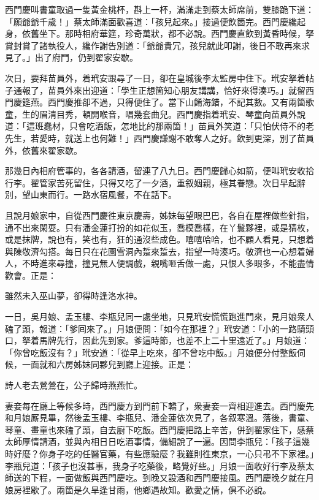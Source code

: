 西門慶叫書童取過一隻黃金桃杯，斟上一杯，滿滿走到蔡太師席前，雙膝跪下道：「願爺爺千歲！」蔡太師滿面歡喜道：「孩兒起來。」接過便飲箇完。西門慶纔起身，依舊坐下。那時相府華筵，珍奇萬狀，都不必說。西門慶直飲到黃昏時候，拏賞封賞了諸執役人，纔作謝告別道：「爺爺貴冗，孩兒就此叩謝，後日不敢再來求見了。」出了府門，仍到翟家安歇。

次日，要拜苗員外，着玳安跟尋了一日，卻在皇城後李太監房中住下。玳安拏着帖子通報了，苗員外來出迎道：「學生正想箇知心朋友講講，恰好來得湊巧。」就留西門慶筵燕。西門慶推卻不過，只得便住了。當下山餚海錯，不記其數。又有兩箇歌童，生的眉清目秀，頓開喉音，唱幾套曲兒。西門慶指着玳安、琴童向苗員外說道：「這班蠢材，只會吃酒飯，怎地比的那兩箇！」苗員外笑道：「只怕伏侍不的老先生，若愛時，就送上也何難！」西門慶謙謝不敢奪人之好。飲到更深，別了苗員外，依舊來翟家歇。

那幾日內相府管事的，各各請酒，留連了八九日。西門慶歸心如箭，便叫玳安收拾行李。翟管家苦死留住，只得又吃了一夕酒，重叙姻親，極其眷戀。次日早起辭別，望山東而行。一路水宿風餐，不在話下。

且說月娘家中，自從西門慶徃東京慶壽，姊妹每望眼巴巴，各自在屋裡做些針指，通不出來閑耍。只有潘金蓮打扮的如花似玉，喬模喬樣，在丫鬟夥裡，或是猜枚，或是抹牌，說也有，笑也有，狂的通沒些成色。嘻嘻哈哈，也不顧人看見，只想着與陳敬濟勾搭。每日只在花園雪洞內踅來踅去，指望一時湊巧。敬濟也一心想着婦人，不時進來尋撞，撞見無人便調戲，親嘴咂舌做一處，只恨人多眼多，不能盡情歡會。正是：

雖然未入巫山夢，卻得時逢洛水神。

一日，吳月娘、孟玉樓、李瓶兒同一處坐地，只見玳安慌慌跑進門來，見月娘衆人磕了頭，報道：「爹囘來了。」月娘便問：「如今在那裡？」玳安道：「小的一路騎頭口，拏着馬牌先行，因此先到家。爹這時節，也差不上二十里遠近了。」月娘道：「你曾吃飯沒有？」玳安道：「從早上吃來，卻不曾吃中飯。」月娘便分付整飯伺候，一面就和六房姊妹同夥兒到廳上迎接。正是：

詩人老去鶯鶯在，公子歸時燕燕忙。

妻妾每在廳上等候多時，西門慶方到門前下轎了，衆妻妾一齊相迎進去。西門慶先和月娘厮見畢，然後孟玉樓、李瓶兒、潘金蓮依次見了，各叙寒溫。落後，書童、琴童、畫童也來磕了頭，自去廚下吃飯。西門慶把路上辛苦，併到翟家住下，感蔡太師厚情請酒，並與內相日日吃酒事情，備細說了一遍。因問李瓶兒：「孩子這幾時好麼？你身子吃的任醫官藥，有些應驗麼？我雖則徃東京，一心只弔不下家裡。」李瓶兒道：「孩子也沒甚事，我身子吃藥後，略覺好些。」月娘一面收好行李及蔡太師送的下程，一面做飯與西門慶吃。到晚又設酒和西門慶接風。西門慶晚夕就在月娘房裡歇了。兩箇是久旱逢甘雨，他鄉遇故知。歡愛之情，俱不必說。

